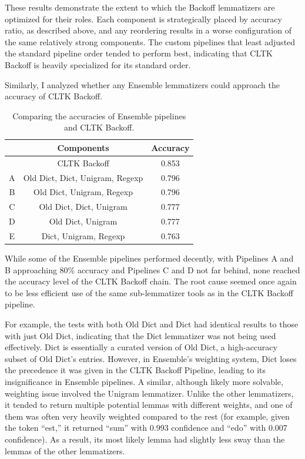 \documentclass[11pt]{article}
\begin{document}
These results demonstrate the extent to which the Backoff lemmatizers are optimized for their roles. Each component is strategically placed by accuracy ratio, as described above, and any reordering results in a worse configuration of the same relatively strong components. The custom pipelines that least adjusted the standard pipeline order tended to perform best, indicating that CLTK Backoff is heavily specialized for its standard order.

Similarly, I analyzed whether any Ensemble lemmatizers could approach the accuracy of CLTK Backoff.

    \begin{table}[]
        \centering
        \begin{tabular}{| c | c | c |}
             \hline
             \ & Components & Accuracy \\
             \hline
             \  & CLTK Backoff & 0.853 \\
             A & Old Dict, Dict, Unigram, Regexp & 0.796 \\
             B & Old Dict, Unigram, Regexp & 0.796 \\
             C & Old Dict, Dict, Unigram & 0.777 \\
             D & Old Dict, Unigram & 0.777 \\
             E & Dict, Unigram, Regexp & 0.763 \\
             \hline
        \end{tabular}
        \caption{Comparing the accuracies of Ensemble pipelines and CLTK Backoff.}
        \label{tab:my_label}
    \end{table}
    
While some of the Ensemble pipelines performed decently, with Pipelines A and B approaching 80\% accuracy and Pipelines C and D not far behind, none reached the accuracy level of the CLTK Backoff chain. The root cause seemed once again to be less efficient use of the same sub-lemmatizer tools as in the CLTK Backoff pipeline.

For example, the tests with both Old Dict and Dict had identical results to those with just Old Dict, indicating that the Dict lemmatizer was not being used effectively. Dict is essentially a curated version of Old Dict, a high-accuracy subset of Old Dict's entries. However, in Ensemble’s weighting system, Dict loses the precedence it was given in the CLTK Backoff Pipeline, leading to its insignificance in Ensemble pipelines. A similar, although likely more solvable, weighting issue involved the Unigram lemmatizer. Unlike the other lemmatizers, it tended to return multiple potential lemmas with different weights, and one of them was often very heavily weighted compared to the rest (for example, given the token “est,” it returned “sum” with 0.993 confidence and “edo” with 0.007 confidence). As a result, its most likely lemma had slightly less sway than the lemmas of the other lemmatizers.
\end{document}
